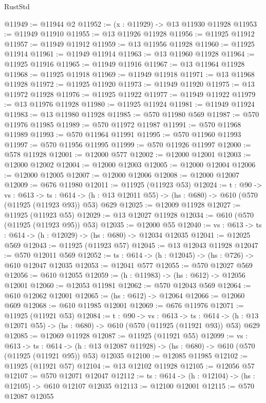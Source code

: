 \begin{lexlean}{RustStd}
\begin{coremodule}
@11949 := @11944 @2
@11952 := (x : @11929) -> @13 @11930 @11928
@11953 := @11949 @11910
@11955 := @13 @11926 @11928
@11956 := @11925 @11912
@11957 := @11949 @11912
@11959 := @13 @11956 @11928
@11960 := @11925 @11914
@11961 := @11949 @11914
@11963 := @13 @11960 @11928
@11964 := @11925 @11916
@11965 := @11949 @11916
@11967 := @13 @11964 @11928
@11968 := @11925 @11918
@11969 := @11949 @11918
@11971 := @13 @11968 @11928
@11972 := @11925 @11920
@11973 := @11949 @11920
@11975 := @13 @11972 @11928
@11976 := @11925 @11922
@11977 := @11949 @11922
@11979 := @13 @11976 @11928
@11980 := @11925 @11924
@11981 := @11949 @11924
@11983 := @13 @11980 @11928
@11985 := @570 @11980 @569
@11987 := @570 @11976 @11985
@11989 := @570 @11972 @11987
@11991 := @570 @11968 @11989
@11993 := @570 @11964 @11991
@11995 := @570 @11960 @11993
@11997 := @570 @11956 @11995
@11999 := @570 @11926 @11997
@12000 := @578 @11928
@12001 := @12000 @577
@12002 := @12000 @12001
@12003 := @12000 @12002
@12004 := @12000 @12003
@12005 := @12000 @12004
@12006 := @12000 @12005
@12007 := @12000 @12006
@12008 := @12000 @12007
@12009 := @676 @11980
@12011 := @11925 (@11923 @53)
@12024 := {t : @90} ->
  {vs : @613} ->
  {ts : @614} -> (h : @13 @12011 @55) -> (hs : @680) -> @610 (@570 (@11925 (@11923 @93)) @53) @629
@12025 := @12009 @11928
@12027 := @11925 (@11923 @55)
@12029 := @13 @12027 @11928
@12034 := @610 (@570 (@11925 (@11923 @95)) @53)
@12035 := @12000 @55
@12040 := {vs : @613} -> {ts : @614} -> (h : @12029) -> (hs : @680) -> @12034 @12035
@12041 := @12025 @569
@12043 := @11925 (@11923 @57)
@12045 := @13 @12043 @11928
@12047 := @570 @12011 @569
@12052 := {ts : @614} -> (h : @12045) -> (hs : @726) -> @610 @12047 @12035
@12053 := @12041 @577
@12055 := @570 @12027 @569
@12056 := @610 @12055
@12059 := (h : @11983) -> (hs : @612) -> @12056 @12001
@12060 := @12053 @11981
@12062 := @570 @12043 @569
@12064 := @610 @12062 @12001
@12065 := (hs : @612) -> @12064
@12066 := @12060 @609
@12068 := @610 @11985 @12001
@12069 := @676 @11976
@12071 := @11925 (@11921 @53)
@12084 := {t : @90} ->
  {vs : @613} ->
  {ts : @614} -> (h : @13 @12071 @55) -> (hs : @680) -> @610 (@570 (@11925 (@11921 @93)) @53) @629
@12085 := @12069 @11928
@12087 := @11925 (@11921 @55)
@12099 := {vs : @613} ->
  {ts : @614} ->
  (h : @13 @12087 @11928) -> (hs : @680) -> @610 (@570 (@11925 (@11921 @95)) @53) @12035
@12100 := @12085 @11985
@12102 := @11925 (@11921 @57)
@12104 := @13 @12102 @11928
@12105 := @12056 @57
@12107 := @570 @12071 @12047
@12112 := {ts : @614} -> (h : @12104) -> (hs : @12105) -> @610 @12107 @12035
@12113 := @12100 @12001
@12115 := @570 @12087 @12055

\end{coremodule}
\end{lexlean}
